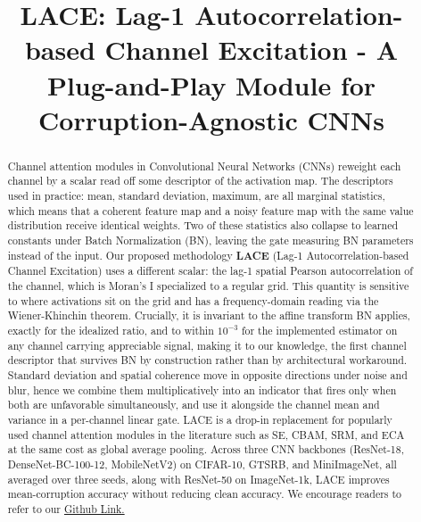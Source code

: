 \documentclass{bmvc2k}
\title{LACE: Lag-1 Autocorrelation-based Channel Excitation - A Plug-and-Play Module for Corruption-Agnostic CNNs}
\begin{document}
\maketitle

\begin{abstract}
Channel attention modules in Convolutional Neural Networks (CNNs) reweight each channel by a scalar read off some descriptor of the activation map. The descriptors used in practice: mean, standard deviation, maximum, are all marginal statistics, which means that a coherent feature map and a noisy feature map with the same value distribution receive identical weights. Two of these statistics also collapse to learned constants under Batch Normalization (BN), leaving the gate measuring BN parameters instead of the input. Our proposed methodology \textbf{LACE} (Lag-1 Autocorrelation-based Channel Excitation) uses a different scalar: the lag-1 spatial Pearson autocorrelation of the channel, which is Moran's I specialized to a regular grid. This quantity is sensitive to where activations sit on the grid and has a frequency-domain reading via the Wiener-Khinchin theorem. Crucially, it is invariant to the affine transform BN applies, exactly for the idealized ratio, and to within $10^{-3}$ for the implemented estimator on any channel carrying appreciable signal, making it to our knowledge, the first channel descriptor that survives BN by construction rather than by architectural workaround. Standard deviation and spatial coherence move in opposite directions under noise and blur, hence we combine them multiplicatively into an indicator that fires only when both are unfavorable simultaneously, and use it alongside the channel mean and variance in a per-channel linear gate. LACE is a drop-in replacement for popularly used channel attention modules in the literature such as SE, CBAM, SRM, and ECA at the same cost as global average pooling. Across three CNN backbones (ResNet-18, DenseNet-BC-100-12, MobileNetV2) on CIFAR-10, GTSRB, and MiniImageNet, all averaged over three seeds, along with ResNet-50 on ImageNet-1k, LACE improves mean-corruption accuracy without reducing clean accuracy. We encourage readers to refer to our \href{https://github.com/KushajM/LACE-Lag-1-Autocorrelation-based-Channel-Excitation}{Github Link.}
\end{abstract}

\end{document}
